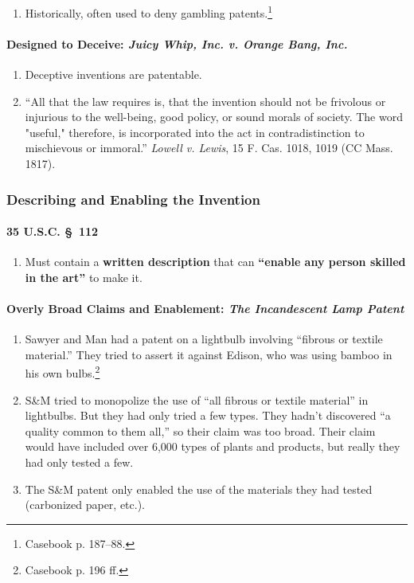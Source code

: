 \begin{enumerate}
    \item Historically, often used to deny gambling patents.\footnote{Casebook 
    p. 187--88.}
\end{enumerate}

\paragraph{Designed to Deceive: \emph{Juicy Whip, Inc. v. Orange Bang, Inc.}} 

\begin{enumerate}
    \item Deceptive inventions are patentable.
    \item ``All that the law requires is, that the invention should not be 
    frivolous or injurious to the well-being, good policy, or sound morals of 
    society. The word "useful," therefore, is incorporated into the act in 
    contradistinction to mischievous or immoral.'' \emph{Lowell v. Lewis}, 15 
    F. Cas. 1018, 1019 (CC Mass. 1817).
\end{enumerate}

\subsubsection{Describing and Enabling the Invention}

\paragraph{35 U.S.C. \S\ 112}

\begin{enumerate}
    \item Must contain a \textbf{written description} that can 
    \textbf{``enable any person skilled in the art''} to make it.
\end{enumerate}

\paragraph{Overly Broad Claims and Enablement: \emph{The Incandescent Lamp 
Patent}}

\begin{enumerate}
    \item Sawyer and Man had a patent on a lightbulb involving ``fibrous or 
    textile material.'' They tried to assert it against Edison, who was using 
    bamboo in his own bulbs.\footnote{Casebook p. 196 ff.}
    \item S\&M tried to monopolize the use of ``all fibrous or textile 
    material'' in lightbulbs. But they had only tried a few types. They hadn't 
    discovered ``a quality common to them all,'' so their claim was too broad.  
    Their claim would have included over 6,000 types of plants and products, 
    but really they had only tested a few.
    \item The S\&M patent only enabled the use of the materials they had 
    tested (carbonized paper, etc.).
\end{enumerate}

